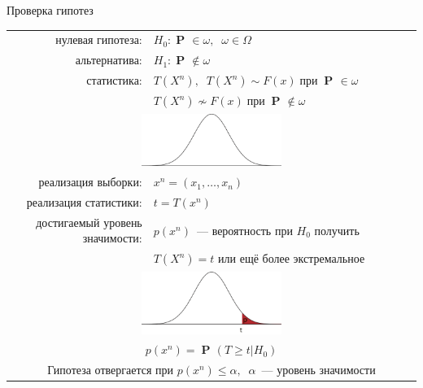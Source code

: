 \documentclass[9pt,pdf,utf8,hyperref={unicode},aspectratio=169]{beamer}
\DeclareMathOperator{\prob}{\mathbf{P}\!}
\begin{document}
\begin{frame}{Проверка гипотез}
{\begin{center}
\begin{tabular}{rl}
				нулевая гипотеза:               & $H_0\colon \prob\in\omega, \;\; \omega\in\Omega$ \\
				альтернатива:                   & $H_1\colon \prob\notin\omega$ \\
				статистика:                     & $T\left(X^n\right), \;\; T\left(X^n\right)\sim F\left(x\right) \;\text{при}\; \prob\in\omega$ \\
				& \;\;\;\;\;\;\;\;\;\;\;\;\;\; $T\left(X^n\right)\not\sim F\left(x\right) \;\text{при}\; \prob\notin\omega$ \\
				\multicolumn{2}{c}{\includegraphics[width=0.35\textwidth]{stats1.png}} \\
				реализация выборки:             & $x^n=\left(x_1,\ldots,x_n\right)$ \\
				реализация статистики:          & $t = T \left(x^n\right)$ \\
				достигаемый уровень значимости: & $p\left(x^n\right)$~--- вероятность при $H_0$ получить \\
				& $T \left(X^n\right)=t$ или ещё более экстремальное\\
				\multicolumn{2}{c}{\includegraphics[width=0.35\textwidth]{stats2.png}} \\
				\multicolumn{2}{c}{ $p\left(x^n\right) = \prob\left(T\geq t\left|H_0\right.\right)$ } \\
				\multicolumn{2}{c}{Гипотеза отвергается при $p\left(x^n\right)\leq\alpha,\;\;\alpha$~--- уровень значимости} \\
			\end{tabular}
		\end{center}
	}
\end{frame}

\end{document}
